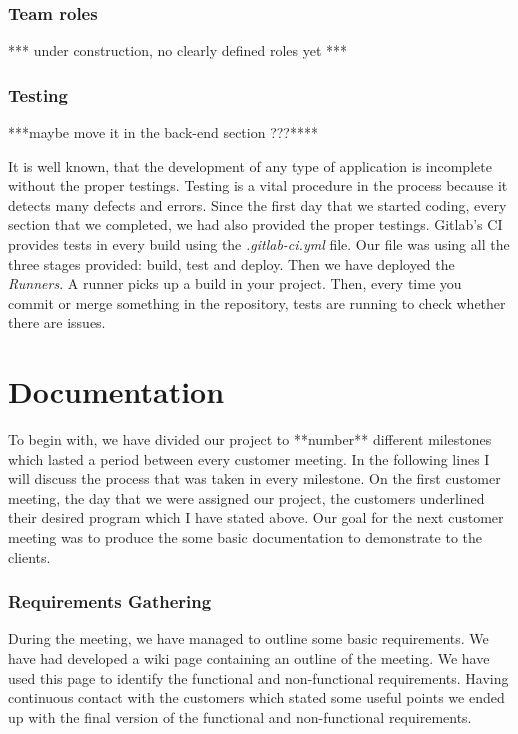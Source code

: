 \documentclass{l3proj}
\begin{document}
\subsubsection{Team roles}
\label{roles}
*** under construction, no clearly defined roles yet ***
 
\subsubsection{Testing}
\label{testing}
***maybe move it in the back-end section ???****

It is well known, that the development of any type of application is incomplete without the proper testings. Testing is a vital procedure in the process because it detects many defects and errors. Since the first day that we started coding, every section that we completed, we had also provided the proper testings. Gitlab's CI provides tests in every build using the \textit{.gitlab-ci.yml} file. Our file was using all the three stages provided: build, test and deploy. Then we have deployed the \textit{Runners}. A runner picks up a build in your project. Then, every time you commit or merge something in the repository, tests are running to check whether there are issues.





\section{Documentation}
\label{documentation}

To begin with, we have divided our project to **number** different milestones which lasted a period between every customer meeting. In the following lines I will discuss the process that was taken in every milestone. On the first customer meeting, the day that we were assigned our project, the customers underlined their desired program which I have stated above. Our goal for the next customer meeting was to produce the some basic documentation to demonstrate to the clients.  

\subsubsection{Requirements Gathering}
\label{requirements}

During the meeting, we have managed to outline some basic requirements. We have had developed a wiki page containing an outline of the meeting. We have used this page to identify the functional and non-functional requirements. Having continuous contact with the customers which stated some useful points we ended up with the final version of the functional and non-functional requirements. 
\end{document}
